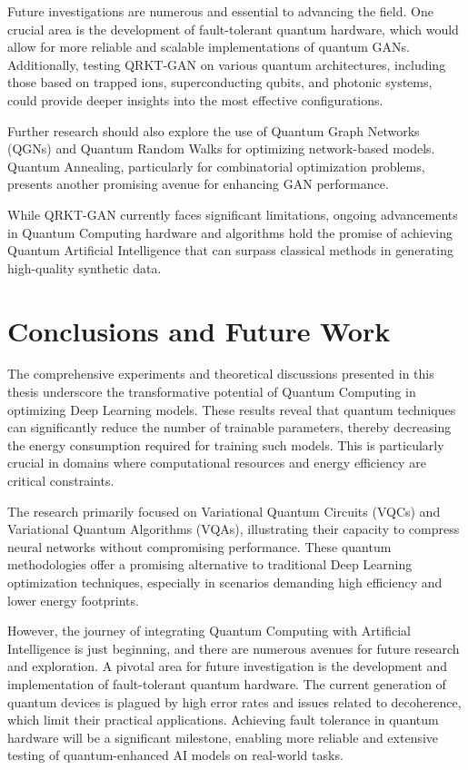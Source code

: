 \documentclass[12pt,a4paper]{report}
\begin{document}
Future investigations are numerous and essential to advancing the field. One crucial area is the development of fault-tolerant quantum hardware, which would allow for more reliable and scalable implementations of quantum GANs. Additionally, testing QRKT-GAN on various quantum architectures, including those based on trapped ions, superconducting qubits, and photonic systems, could provide deeper insights into the most effective configurations.

Further research should also explore the use of Quantum Graph Networks (QGNs) and Quantum Random Walks for optimizing network-based models. Quantum Annealing, particularly for combinatorial optimization problems, presents another promising avenue for enhancing GAN performance.

While QRKT-GAN currently faces significant limitations, ongoing advancements in Quantum Computing hardware and algorithms hold the promise of achieving Quantum Artificial Intelligence that can surpass classical methods in generating high-quality synthetic data.

\chapter{Conclusions and Future Work}\vspace{-12pt}
The comprehensive experiments and theoretical discussions presented in this thesis underscore the transformative potential of Quantum Computing in optimizing Deep Learning models. These results reveal that quantum techniques can significantly reduce the number of trainable parameters, thereby decreasing the energy consumption required for training such models. This is particularly crucial in domains where computational resources and energy efficiency are critical constraints.

The research primarily focused on Variational Quantum Circuits (VQCs) and Variational Quantum Algorithms (VQAs), illustrating their capacity to compress neural networks without compromising performance. These quantum methodologies offer a promising alternative to traditional Deep Learning optimization techniques, especially in scenarios demanding high efficiency and lower energy footprints.

However, the journey of integrating Quantum Computing with Artificial Intelligence is just beginning, and there are numerous avenues for future research and exploration. A pivotal area for future investigation is the development and implementation of fault-tolerant quantum hardware. The current generation of quantum devices is plagued by high error rates and issues related to decoherence, which limit their practical applications. Achieving fault tolerance in quantum hardware will be a significant milestone, enabling more reliable and extensive testing of quantum-enhanced AI models on real-world tasks.
\end{document}
